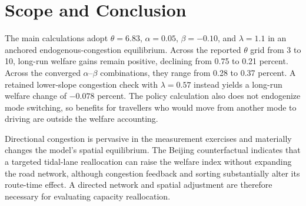 \documentclass[12pt]{article}
\begin{document}
\section{Scope and Conclusion}

The main calculations adopt $\theta=6.83$, $\alpha=0.05$, $\beta=-0.10$, and $\lambda=1.1$ in an anchored endogenous-congestion equilibrium. Across the reported $\theta$ grid from 3 to 10, long-run welfare gains remain positive, declining from 0.75 to 0.21 percent. Across the converged $\alpha$--$\beta$ combinations, they range from 0.28 to 0.37 percent. A retained lower-slope congestion check with $\lambda=0.57$ instead yields a long-run welfare change of $-0.078$ percent. The policy calculation also does not endogenize mode switching, so benefits for travellers who would move from another mode to driving are outside the welfare accounting.

Directional congestion is pervasive in the measurement exercises and materially changes the model's spatial equilibrium. The Beijing counterfactual indicates that a targeted tidal-lane reallocation can raise the welfare index without expanding the road network, although congestion feedback and sorting substantially alter its route-time effect. A directed network and spatial adjustment are therefore necessary for evaluating capacity reallocation.



\end{document}
